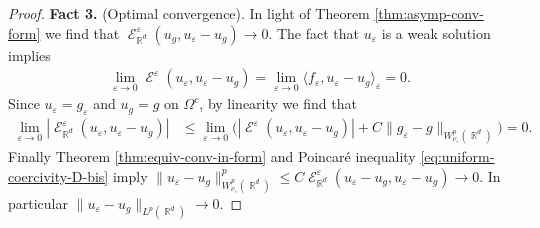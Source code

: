 \documentclass[12pt, reqno]{amsart}%
\theoremstyle{plain}  %
\theoremstyle{definition}  %
\numberwithin{equation}{section}
\DeclareMathOperator{\cE}{\mathcal{E}}
\DeclareMathOperator{\R}{\mathbb{R}}
\newcommand{\eps}{\varepsilon}
\begin{document}
\begin{proof}
\textbf{Fact 3.} (Optimal convergence).  In light of Theorem \ref{thm:asymp-conv-form}  we find that $\cE^\eps_{\R^d}(u_g, u_\eps-u_g)\to0$.  The fact that $u_\eps$ is a weak solution implies
\begin{align*}
\lim_{\eps\to0}\cE^\eps(u_\eps, u_\eps-u_g)= \lim_{\eps\to0}\langle f_\eps, u_\eps-u_g\rangle_\eps=0.
\end{align*}
Since $u_\eps= g_\eps$  and $u_g= g$ on $\Omega^c$, by linearity we find that
\begin{align*}
\lim_{\eps\to0}|\cE^\eps_{\R^d}(u_\eps, u_\eps-u_g)|
&\leq \lim_{\eps\to0}\big(|\cE^\eps(u_\eps, u_\eps-u_g)|+ C\|g_\eps-g\|_{W^{p}_{\nu_\eps}(\R^d)} \big)=0.
\end{align*}
Finally Theorem \ref{thm:equiv-conv-in-form} and Poincar\'e inequality \eqref{eq:uniform-coercivity-D-bis} imply  $\|u_{\eps}-u_g\|^p_{W^p_{\nu_\eps}(\R^d)}\leq C\cE^\eps_{\R^d}(u_\eps -u_g,u_\eps -u_g)\to0.$ In particular $\|u_{\eps}-u_g\|_{L^p(\R^d)}\to0.$
\end{proof}
\smallskip
\end{document}
